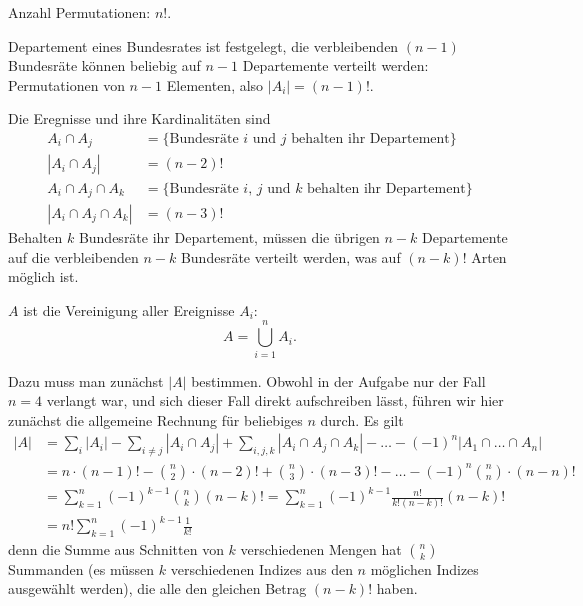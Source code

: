\begin{loesung}
\begin{teilaufgaben}
\item Anzahl Permutationen: $n!$.
\item Departement eines Bundesrates ist festgelegt, die verbleibenden
$(n-1)$ Bundesräte können beliebig auf $n-1$ Departemente verteilt
werden: Permutationen von $n-1$ Elementen, also $|A_i|=(n-1)!$.
\item Die Eregnisse und ihre Kardinalitäten sind
\begin{align*}
A_i\cap A_j&=\{\text{Bundesräte $i$ und $j$ behalten ihr Departement}\}
\\
|A_i\cap A_j|&=(n-2)!
\\
A_i\cap A_j\cap A_k&=\{\text{Bundesräte $i$, $j$ und $k$ behalten ihr Departement}\}
\\
|A_i\cap A_j\cap A_k|&=(n-3)!
\end{align*}
Behalten $k$ Bundesräte ihr Departement, müssen die übrigen
$n-k$ Departemente auf  die verbleibenden $n-k$ Bundesräte verteilt
werden, was auf $(n-k)!$ Arten möglich ist.
\item
\item $A$ ist die Vereinigung aller Ereignisse $A_i$:
\[
A=\bigcup_{i=1}^nA_i.
\]
\item
Dazu muss man zunächst $|A|$ bestimmen.
Obwohl in der Aufgabe nur der Fall $n=4$ verlangt war, und sich dieser
Fall direkt aufschreiben lässt, führen wir hier zunächst die allgemeine
Rechnung für beliebiges $n$ durch.
Es gilt
\begin{align*}
|A|&=\sum_{i}|A_i| - \sum_{i\ne j}|A_i\cap A_j| + \sum_{i,j,k}|A_i\cap A_j\cap A_k|-\dots-(-1)^n|A_1\cap\dots\cap A_n|
\\
&=
n\cdot (n-1)!
-\binom{n}{2}\cdot (n-2)!
+\binom{n}{3}\cdot (n-3)!
-\dots
-(-1)^n
\binom{n}{n}\cdot (n-n)!
\\
&=\sum_{k=1}^n(-1)^{k-1}\binom{n}{k}(n-k)!
=\sum_{k=1}^n(-1)^{k-1}\frac{n!}{k!(n-k)!}(n-k)!
\\
&=n!\sum_{k=1}^n(-1)^{k-1}\frac{1}{k!}
\end{align*}
denn die Summe aus Schnitten von $k$ verschiedenen Mengen hat
$\binom{n}{k}$ Summanden (es müssen $k$ verschiedenen Indizes
aus den $n$ möglichen Indizes ausgewählt werden), die alle
den gleichen Betrag $(n-k)!$ haben.


\end{teilaufgaben}
\end{loesung}
